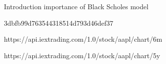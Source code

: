 Introduction
importance of Black Scholes model


3dbfb99d763544318514d793d46def37

https://api.iextrading.com/1.0/stock/aapl/chart/6m



https://api.iextrading.com/1.0/stock/aapl/chart/5y


